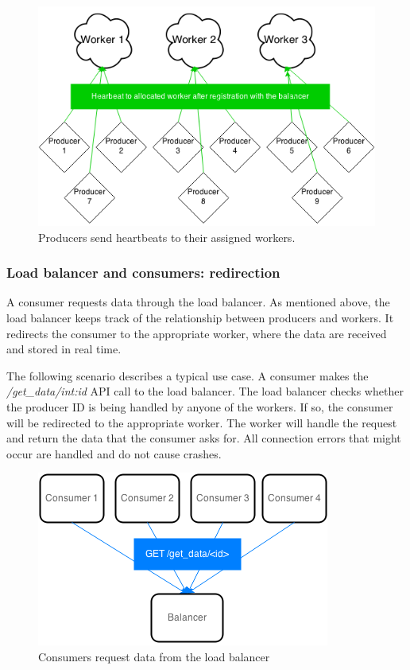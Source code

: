 \documentclass{sigchi}
\begin{document}
\begin{figure}[!h]
\centering
\includegraphics[width=0.9\columnwidth]{img/heartbeat}
\caption{Producers send heartbeats to their assigned workers.}
\label{fig:heartbeat}
\end{figure}

\subsubsection{Load balancer and consumers: redirection}

A consumer requests data through the load balancer. As mentioned above, the load balancer keeps track of the relationship between producers and workers. It redirects the consumer to the appropriate worker, where the data are received and stored in real time.

The following scenario describes a typical use case. A consumer makes the {\it /get\_data/int:id} API call to the load balancer. The load balancer checks whether the producer ID is being handled by anyone of the workers. If so, the consumer will be redirected to the appropriate worker. The worker will handle the request and return the data that the consumer asks for. All connection errors that might occur are handled and do not cause crashes.

\begin{figure}[!h]
\centering
\includegraphics[width=0.9\columnwidth]{img/consumer_req}
\caption{Consumers request data from the load balancer}
\label{fig:consumer_req}
\end{figure}
\end{document}
